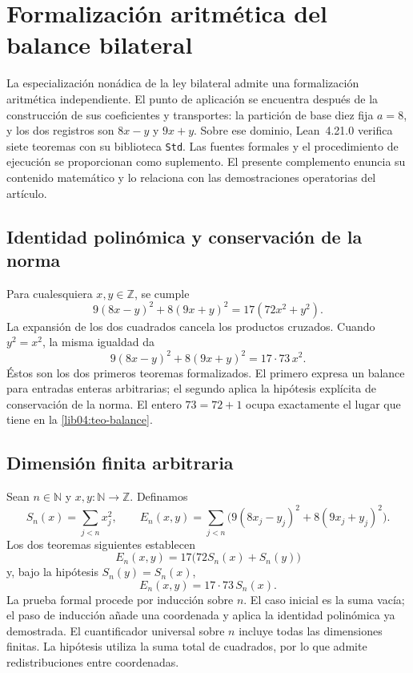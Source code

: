 \section*{Formalización aritmética del balance bilateral}
\label{libro:formalizacion-lean}

La especialización nonádica de la ley bilateral admite una formalización
aritmética independiente. El punto de aplicación se encuentra después de la
construcción de sus coeficientes y transportes: la partición de base diez fija
\(a=8\), y los dos registros son \(8x-y\) y \(9x+y\). Sobre ese dominio,
Lean~4.21.0 verifica siete teoremas con su biblioteca \texttt{Std}. Las fuentes
formales y el procedimiento de ejecución se proporcionan como suplemento.
El presente complemento enuncia su contenido matemático y lo relaciona con
las demostraciones operatorias del artículo.

\subsection*{Identidad polinómica y conservación de la norma}

Para cualesquiera \(x,y\in\mathbb Z\), se cumple
\[
 9(8x-y)^2+8(9x+y)^2=17(72x^2+y^2).
\]
La expansión de los dos cuadrados cancela los productos cruzados. Cuando
\(y^2=x^2\), la misma igualdad da
\[
 9(8x-y)^2+8(9x+y)^2=17\cdot73\,x^2.
\]
Éstos son los dos primeros teoremas formalizados. El primero expresa un
balance para entradas enteras arbitrarias; el segundo aplica la hipótesis
explícita de conservación de la norma. El entero \(73=72+1\) ocupa
exactamente el lugar que tiene en la \cref{lib04:teo-balance}.

\subsection*{Dimensión finita arbitraria}

Sean \(n\in\mathbb N\) y \(x,y:\mathbb N\to\mathbb Z\). Definamos
\[
 S_n(x)=\sum_{j<n}x_j^2,
 \qquad
 E_n(x,y)=\sum_{j<n}\bigl(9(8x_j-y_j)^2+8(9x_j+y_j)^2\bigr).
\]
Los dos teoremas siguientes establecen
\[
 E_n(x,y)=17\bigl(72S_n(x)+S_n(y)\bigr)
\]
y, bajo la hipótesis \(S_n(y)=S_n(x)\),
\[
 E_n(x,y)=17\cdot73\,S_n(x).
\]
La prueba formal procede por inducción sobre \(n\). El caso inicial es la
suma vacía; el paso de inducción añade una coordenada y aplica la identidad
polinómica ya demostrada. El cuantificador universal sobre \(n\) incluye
todas las dimensiones finitas. La hipótesis utiliza la suma total de
cuadrados, por lo que admite redistribuciones entre coordenadas.

